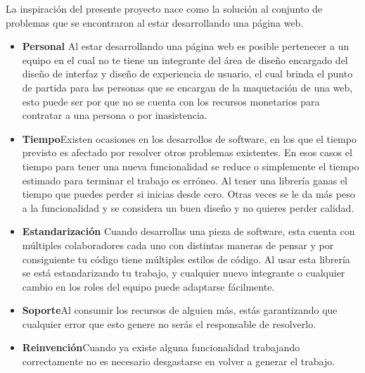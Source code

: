 La inspiración del presente proyecto nace como la solución al conjunto de problemas que se encontraron al estar desarrollando una página web.

\begin{itemize}

   \item \textbf{Personal} \newline Al estar desarrollando una página web es posible pertenecer a un equipo en el cual no te tiene un integrante del área de diseño encargado del diseño de interfaz y diseño de experiencia de usuario, el cual brinda el punto de partida para las personas que se encargan de la maquetación de una web, esto puede ser por que no se cuenta con los recursos monetarios para contratar a una persona o por inasistencia.  
   \item \textbf{Tiempo}\newline  Existen ocasiones en los desarrollos de software, en los que el tiempo previsto es afectado por resolver otros problemas existentes. En esos casos el tiempo para tener una nueva funcionalidad se reduce o simplemente el tiempo estimado para terminar el trabajo es erróneo. Al tener una librería ganas el tiempo que puedes perder si inicias desde cero. Otras veces se le da más peso a la funcionalidad y se considera un buen diseño y no quieres perder calidad.
   \item \textbf{Estandarización} \newline Cuando desarrollas una pieza de software, esta cuenta con múltiples colaboradores cada uno con distintas maneras de pensar y por consiguiente tu código tiene múltiples estilos de código.   Al usar esta librería se está estandarizando tu trabajo, y cualquier nuevo integrante o cualquier cambio en los roles del equipo puede adaptarse fácilmente.
   \item \textbf{Soporte}\newline  Al consumir los recursos de alguien más, estás garantizando que cualquier error que esto genere no serás el responsable de resolverlo.
   \item \textbf{Reinvención}\newline  Cuando ya existe alguna funcionalidad trabajando correctamente no es necesario desgastarse en volver a generar el trabajo.
\end{itemize}